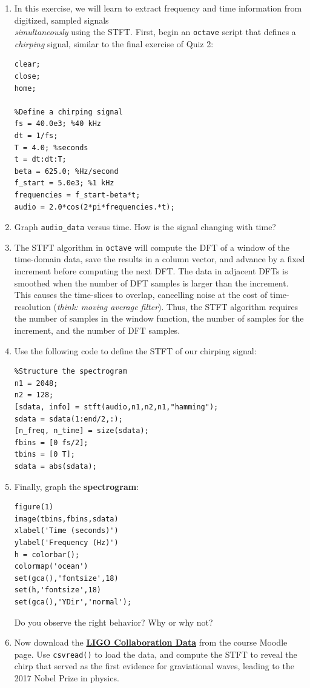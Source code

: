\documentclass{article}
\begin{document}
\begin{enumerate}
\item In this exercise, we will learn to extract frequency and time information from digitized, sampled signals \\ \textit{simultaneously} using the STFT.  First, begin an \verb+octave+ script that defines a \textit{chirping} signal, similar to the final exercise of Quiz 2:
\begin{verbatim}
clear;
close;
home;

%Define a chirping signal
fs = 40.0e3; %40 kHz
dt = 1/fs;
T = 4.0; %seconds
t = dt:dt:T;
beta = 625.0; %Hz/second
f_start = 5.0e3; %1 kHz
frequencies = f_start-beta*t;
audio = 2.0*cos(2*pi*frequencies.*t);
\end{verbatim}
\item Graph \verb+audio_data+ versus time.  How is the signal changing with time?
\item The STFT algorithm in \verb+octave+ will compute the DFT of a window of the time-domain data, save the results in a column vector, and advance by a fixed increment before computing the next DFT.  The data in adjacent DFTs is smoothed when the number of DFT samples is larger than the increment.  This causes the time-slices to overlap, cancelling noise at the cost of time-resolution (\textit{think: moving average filter}).  Thus, the STFT algorithm requires the number of samples in the window function, the number of samples for the increment, and the number of DFT samples.
\item Use the following code to define the STFT of our chirping signal:
\begin{verbatim}
%Structure the spectrogram
n1 = 2048;
n2 = 128;
[sdata, info] = stft(audio,n1,n2,n1,"hamming");
sdata = sdata(1:end/2,:);
[n_freq, n_time] = size(sdata);
fbins = [0 fs/2];
tbins = [0 T];
sdata = abs(sdata);
\end{verbatim}
\item Finally, graph the \textbf{spectrogram}:
\begin{verbatim}
figure(1)
image(tbins,fbins,sdata)
xlabel('Time (seconds)')
ylabel('Frequency (Hz)')
h = colorbar();
colormap('ocean')
set(gca(),'fontsize',18)
set(h,'fontsize',18)
set(gca(),'YDir','normal');
\end{verbatim}
Do you observe the right behavior?  Why or why not?
\item Now download the \textbf{\href{https://cms.whittier.edu/mod/resource/view.php?id=683066}{LIGO Collaboration Data}} from the course Moodle page.  Use \verb+csvread()+ to load the data, and compute the STFT to reveal the chirp that served as the first evidence for graviational waves, leading to the 2017 Nobel Prize in physics.
\end{enumerate}
\end{document}
